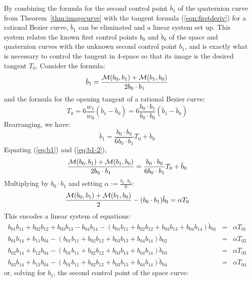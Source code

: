 \documentclass[12pt]{article}
\begin{document}
By combining the formula for the second control point $\breve{b}_1$ of the 
quaternion curve from Theorem~\ref{thm:imagecurve} 
with the tangent formula (\ref{eqn:firstderiv}) for a rational
Bezier curve, $\breve{b}_1$ can be eliminated and a linear system set up.
This system relates the known first control points $b_0$ and $\breve{b}_0$
of the space and quaternion curves with the unknown second control point $b_1$,
and is exactly what is necessary to control the tangent in 4-space so that its image
is the desired tangent $T_0$.
Consider the formula:
\begin{equation}
\label{eq:b1}
\breve{b}_1 = \frac{{\cal M}(b_0,b_1) + {\cal M}(b_1,b_0)}{2b_0 \cdot b_1}
\end{equation}
and the formula for the opening tangent of a rational Bezier curve: 
\[
T_0 = 6 \frac{w_1}{w_0}(\breve{b}_1 - \breve{b}_0)
            = 6\frac{b_0 \cdot b_1}{b_0 \cdot b_0} (\breve{b}_1 - \breve{b}_0)
\]
Rearranging, we have:
\begin{equation}
\label{eq:b1-2}
        \breve{b}_1 = \frac{b_0 \cdot b_0}{6b_0 \cdot b_1} T_0 + \breve{b}_0
\end{equation}
Equating (\ref{eq:b1}) and (\ref{eq:b1-2}),
\[
\frac{{\cal M}(b_0,b_1) + {\cal M}(b_1,b_0)}{2b_0 \cdot b_1} = 
\frac{b_0 \cdot b_0}{6b_0 \cdot b_1} T_0 + \breve{b}_0
\]
Multiplying by $b_0 \cdot b_1$ and setting $\alpha := \frac{b_0 \cdot b_0}{6}$:
\begin{equation}
\frac{{\cal M}(b_0,b_1) + {\cal M}(b_1,b_0)}{2} - (b_0 \cdot b_1) \breve{b}_0 =
\alpha T_0
\end{equation}
This encodes a linear system of equations:
\begin{eqnarray}
b_{01}b_{11} + b_{02}b_{12} + b_{03}b_{13} - b_{04}b_{14} -
(b_{01}b_{11} + b_{02}b_{12} + b_{03}b_{13} + b_{04}b_{14}) \breve{b}_{01}
& = & \alpha T_{01} \nonumber \\
b_{01}b_{14} + b_{11}b_{04} - 
(b_{01}b_{11} + b_{02}b_{12} + b_{03}b_{13} + b_{04}b_{14}) \breve{b}_{02}
& = & \alpha T_{02} \nonumber \\
b_{02}b_{14} + b_{12}b_{04} - 
(b_{01}b_{11} + b_{02}b_{12} + b_{03}b_{13} + b_{04}b_{14}) \breve{b}_{03}
& = & \alpha T_{03} \nonumber \\
b_{03}b_{14} + b_{13}b_{04} - 
(b_{01}b_{11} + b_{02}b_{12} + b_{03}b_{13} + b_{04}b_{14}) \breve{b}_{04}
& = & \alpha T_{04} \nonumber
\end{eqnarray}
or, solving for $b_1$, the second control point of the space curve:
\end{document}
